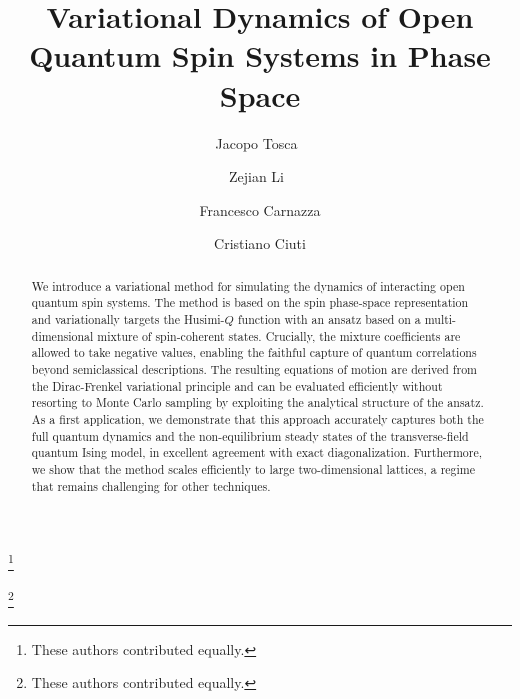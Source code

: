 \documentclass[aps,prl,twocolumn,superscriptaddress,english,floatfix]{revtex4-2}
\begin{document}
\title{Variational Dynamics of Open Quantum Spin Systems in Phase Space}

\author{Jacopo Tosca~}
\thanks{These authors contributed equally.}

\author{Zejian Li~}
\thanks{These authors contributed equally.}

\author{Francesco Carnazza } 

\author{Cristiano Ciuti }
%
\begin{abstract}
We introduce a variational method for simulating the dynamics of interacting open quantum spin systems. The method is based on the spin phase-space representation and variationally targets the Husimi-$Q$ function with an ansatz based on a multi-dimensional mixture of spin-coherent states. Crucially, the mixture coefficients are allowed to take negative values, enabling the faithful capture of quantum correlations beyond semiclassical descriptions. The resulting equations of motion are derived from the Dirac-Frenkel variational principle and can be evaluated efficiently without resorting to Monte Carlo sampling by exploiting the analytical structure of the ansatz. As a first application, we demonstrate that this approach accurately captures both the full quantum dynamics and the non-equilibrium steady states of the transverse-field quantum Ising model, in excellent agreement with exact diagonalization. Furthermore, we show that the method scales efficiently to large two-dimensional lattices, a regime that remains challenging for other techniques.
\end{abstract}

\maketitle
\end{document}
